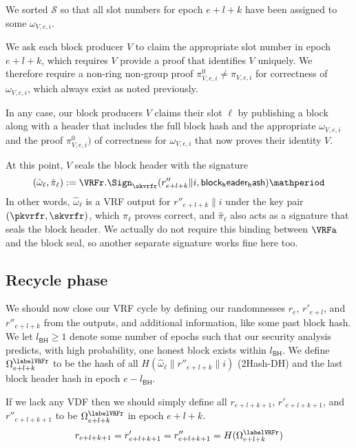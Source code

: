 We sorted $\mathcal{S}$ so that all slot numbers for epoch $e+l+k$ have been assigned to some $\omega_{V,e,i}$.  

We ask each block producer $V$ to claim the appropriate slot number in epoch $e+l+k$, which requires $V$ provide a proof that identifies $V$ uniquely.  
We therefore require a non-ring non-group proof $\pi^0_{V,e,i} \ne \pi_{V,e,i}$ for correctness of $\omega_{V,e,i}$, which always exist as noted previously.

In any case, our block producers $V$ claims their slot $\ell$ by publishing a block along with a header that includes the full block hash and the appropriate $\omega_{V,e,i}$ and the proof $\pi^0_{V,e,i})$ of correctness for $\omega_{V,e,i}$ that now proves their identity $V$.  

At this point, $V$ seals the block header with the signature
$$ (\hat{\omega}_{\ell},\hat{\pi}_{\ell}) := \VRFr.\Sign_{\skvrfr}(r''_{e+l+k} \| i, \mathsf{block_header_hash}) \mathperiod $$
In other words, $\hat{\omega}_{\ell}$ is a VRF output for $r''_{e+l+k} \| i$ under the key pair $(\pkvrfr,\skvrfr)$, which $\hat{\pi}_{\ell}$ proves correct, and $\hat{\pi}_{\ell}$ also acts as a signature that seals the block header.  We actually do not require this binding between $\VRFa$ and the block seal, so another separate signature works fine here too.


\subsection{Recycle phase}\label{subsec:recycle_phase}
\newcommand\id{\mathsf{id}}
\newcommand{\epochsdelayforblockhash}{l_{\mathsf{BH}}}
\newcommand{\epochsdelayforVDF}{l_{\mathsf{VDF}}}

We should now close our VRF cycle by defining our randomnesses $r_e$, $r'_{e+l}$, and $r''_{e+l+k}$ from the \VRFr outputs, and additional information, like some past block hash.  We let $\epochsdelayforblockhash \ge 1$ denote some number of epochs such that our security analysis predicts, with high probability, one honest block exists within $\epochsdelayforblockhash$.  We define $\Omega^{\labelVRFr}_{e+l+k}$ to be the hash of all $H(\hat{\omega}_{\ell} \| r''_{e+l+k} \| i)$ (2Hash-DH) and the last block header hash in epoch $e - \epochsdelayforblockhash$.

If we lack any VDF then we should simply define all $r_{e+l+k+1}$, $r'_{e+l+k+1}$, and $r''_{e+l+k+1}$ to be $\Omega^{\labelVRFr}_{e+l+k}$ in epoch $e+l+k$.
$$
r_{e+l+k+1} = r'_{e+l+k+1} = r''_{e+l+k+1} = H(\Omega^{\labelVRFr}_{e+l+k})
$$

